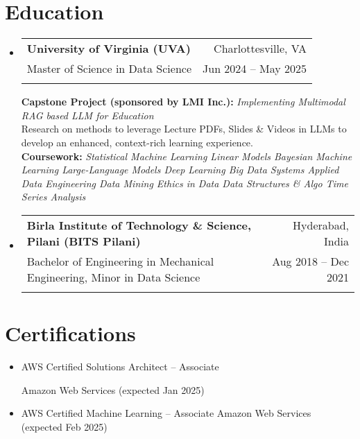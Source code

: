 \documentclass[letter paper,11pt]{article}
\makeatletter
\newcommand{\resumeItem}[1]{
\justifying
\vspace{-2.4px}
  \item\small{
    {#1}
  }
}
\newcommand{\resumeSubheading}[5]{%
  \item
    \begin{tabular*}
    {1\textwidth}
    {l@{\extracolsep{\fill}}r}
      \textbf{#1} & \small#2 \\
      {\small#3} & {\small #4} \\
      {\small#5}
    \end{tabular*}%
  \vspace{-0.95cm}
}
\newcommand{\resumeSubHeadingListStart}{\begin{itemize}[leftmargin=0.0in, label={}]}
\newcommand{\resumeSubHeadingListEnd}{\end{itemize}}
\newcommand{\resumeItemListStart}{\vspace{1pt}\begin{itemize}}
\newcommand{\resumeItemListEnd}{\end{itemize}}
\makeatother
\begin{document}
\section{\large{Education}}
    \resumeSubHeadingListStart
    
    \resumeSubheading
         {University of Virginia (UVA)}{Charlottesville, VA}
        {Master of Science in Data Science}{Jun 2024 -- May 2025}{}
        
        \vspace{9pt}
        
        \footnotesize{\textbf{Capstone Project (sponsored by LMI Inc.):} \textsl{Implementing Multimodal RAG based LLM for Education} \\
        {Research on methods to leverage Lecture PDFs, Slides \& Videos in LLMs to develop an enhanced, context-rich learning experience.
        }\\
        \vspace{2px}
        \textbf{Coursework:}
        \textsl{Statistical Machine Learning \textbullet{} 
        Linear Models \textbullet{} 
        Bayesian Machine Learning \textbullet{} 
        Large-Language Models \textbullet{}
        Deep Learning \textbullet{}
        Big Data Systems \textbullet{} 
        Applied Data Engineering \textbullet{}
        Data Mining \textbullet{} 
        Ethics in Data \textbullet{} 
        Data Structures \& Algo \textbullet{}
        Time Series Analysis
        }}

    
    \vspace{3pt}    
    \resumeSubheading
        {\small{Birla Institute of Technology \& Science, Pilani (BITS Pilani)}}{Hyderabad, India}
        {Bachelor of Engineering in Mechanical Engineering, Minor in Data Science}{Aug 2018 -- Dec 2021}{}
   

 \resumeSubHeadingListEnd 
%



\vspace{-14pt}
\section{\large{Certifications}}

\vspace{2px}
\resumeItemListStart
\resumeItem{AWS Certified Solutions Architect – Associate}
\hfill{Amazon Web Services (expected Jan 2025)}

\vspace{-7pt}
\resumeItem{AWS Certified Machine Learning – Associate}\hfill{Amazon Web Services (expected Feb 2025)}
\resumeItemListEnd
 
\end{document}
